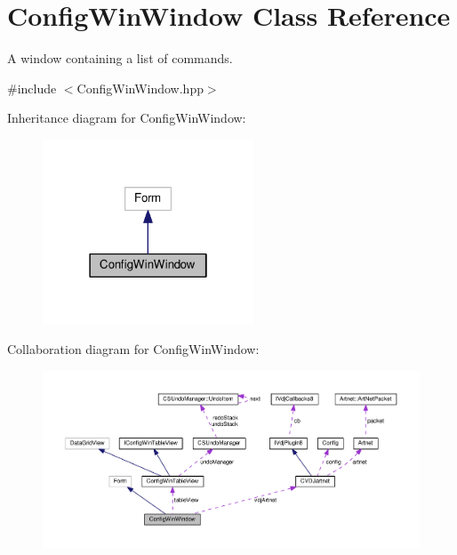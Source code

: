 \hypertarget{classConfigWinWindow}{}\section{Config\+Win\+Window Class Reference}
\label{classConfigWinWindow}


A window containing a list of commands.  




{\ttfamily \#include $<$Config\+Win\+Window.\+hpp$>$}



Inheritance diagram for Config\+Win\+Window\+:
\nopagebreak
\begin{figure}[H]
\begin{center}
\leavevmode
\includegraphics[width=178pt]{classConfigWinWindow__inherit__graph}
\end{center}
\end{figure}


Collaboration diagram for Config\+Win\+Window\+:
\nopagebreak
\begin{figure}[H]
\begin{center}
\leavevmode
\includegraphics[width=350pt]{classConfigWinWindow__coll__graph}
\end{center}
\end{figure}
